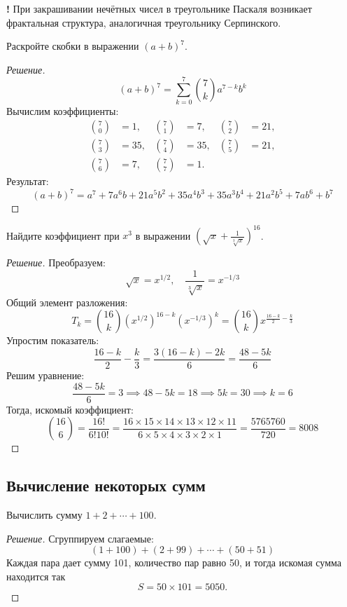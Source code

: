 \begin{mydanger}{\bf !}
При закрашивании нечётных чисел в треугольнике Паскаля возникает фрактальная структура, аналогичная треугольнику Серпинского.    
\end{mydanger}

\begin{problem}
    Раскройте скобки в выражении \((a + b)^7\).
\end{problem}

\begin{proof}[Решение]
\[
(a + b)^7 = \sum_{k=0}^{7} \binom{7}{k} a^{7-k} b^k
\]
Вычислим коэффициенты:
\begin{align*}
\binom{7}{0} &= 1, &\binom{7}{1} &= 7, &\binom{7}{2} &= 21, \\
\binom{7}{3} &= 35, &\binom{7}{4} &= 35, &\binom{7}{5} &= 21, \\
\binom{7}{6} &= 7, &\binom{7}{7} &= 1.
\end{align*}
Результат:
\[
(a + b)^7 = a^7 + 7a^6b + 21a^5b^2 + 35a^4b^3 + 35a^3b^4 + 21a^2b^5 + 7ab^6 + b^7
\]    
\end{proof}


\begin{problem}
    Найдите коэффициент при \(x^3\) в выражении \(\left( \sqrt{x} + \frac{1}{\sqrt[3]{x}} \right)^{16}\). 
\end{problem}
\begin{proof}[Решение]
Преобразуем:
\[
\sqrt{x} = x^{1/2}, \quad \frac{1}{\sqrt[3]{x}} = x^{-1/3}
\]
Общий элемент разложения:
\[
T_k = \binom{16}{k} (x^{1/2})^{16-k} (x^{-1/3})^k = \binom{16}{k} x^{\frac{16-k}{2} - \frac{k}{3}}
\]
Упростим показатель:
\[
\frac{16-k}{2} - \frac{k}{3} = \frac{3(16-k) - 2k}{6} = \frac{48 - 5k}{6}
\]
Решим уравнение:
\[
\frac{48 - 5k}{6} = 3 \implies 48 - 5k = 18 \implies 5k = 30 \implies k = 6
\]
Тогда, искомый коэффициент:
\[
\binom{16}{6} = \frac{16!}{6!10!} = \frac{16×15×14×13×12×11}{6×5×4×3×2×1} = \frac{5765760}{720} = 8008
\]    
\end{proof}


\subsection{Вычисление некоторых сумм}

\begin{problem}
    Вычислить сумму \(1 + 2 + \cdots + 100\).
\end{problem}

\begin{proof}[Решение]
Сгруппируем слагаемые:
\[
(1 + 100) + (2 + 99) + \cdots + (50 + 51)
\]
Каждая пара дает сумму 101, количество пар равно 50, и тогда искомая сумма находится так
\[
S = 50 \times 101 = 5050.
\]    
\end{proof}


